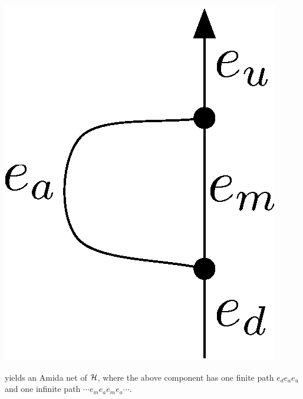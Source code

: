 \begin{definition}
\begin{itemize}
\begin{center}
	 \includegraphics[scale=0.4]{oneedge_amida.eps}
	\end{center}
       yields an Amida net of $\mathcal{H}$,
       where the above component has
       one finite path $e_de_ae_u$
       and one infinite path $\cdots e_m e_a e_m e_a \cdots$.
\end{itemize}
 \end{definition}


